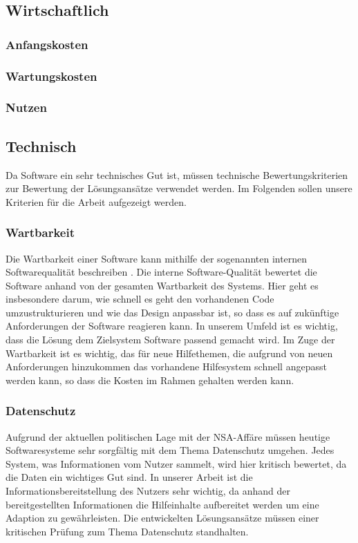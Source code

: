 \subsection{Wirtschaftlich}
\subsubsection{Anfangskosten}
\subsubsection{Wartungskosten}
\subsubsection{Nutzen}

\subsection{Technisch}
Da Software ein sehr technisches Gut ist, müssen technische Bewertungskriterien zur Bewertung der Lösungsansätze verwendet werden. Im Folgenden sollen unsere Kriterien für die Arbeit aufgezeigt werden.

\subsubsection{Wartbarkeit}
Die Wartbarkeit einer Software kann mithilfe der sogenannten internen Softwarequalität beschreiben \cite{softQuali}. Die interne Software-Qualität bewertet die Software anhand von der gesamten Wartbarkeit des Systems. Hier geht es insbesondere darum, wie schnell es geht den vorhandenen Code umzustrukturieren und wie das Design anpassbar ist, so dass es auf zukünftige Anforderungen der Software reagieren kann. In unserem Umfeld ist es wichtig, dass die Lösung dem Zielsystem Software passend gemacht wird. Im Zuge der Wartbarkeit ist es wichtig, das für neue Hilfethemen, die aufgrund von neuen Anforderungen hinzukommen das vorhandene Hilfesystem schnell angepasst werden kann, so dass die Kosten im Rahmen gehalten werden kann.
\subsubsection{Datenschutz}
Aufgrund der aktuellen politischen Lage mit der NSA-Affäre müssen heutige Softwaresysteme sehr sorgfältig mit dem Thema Datenschutz umgehen. Jedes System, was Informationen vom Nutzer sammelt, wird hier kritisch bewertet, da die Daten ein wichtiges Gut sind. In unserer Arbeit ist die Informationsbereitstellung des Nutzers sehr wichtig, da anhand der bereitgestellten Informationen die Hilfeinhalte aufbereitet werden um eine Adaption zu gewährleisten. Die entwickelten Lösungsansätze müssen einer kritischen Prüfung zum Thema Datenschutz standhalten.
